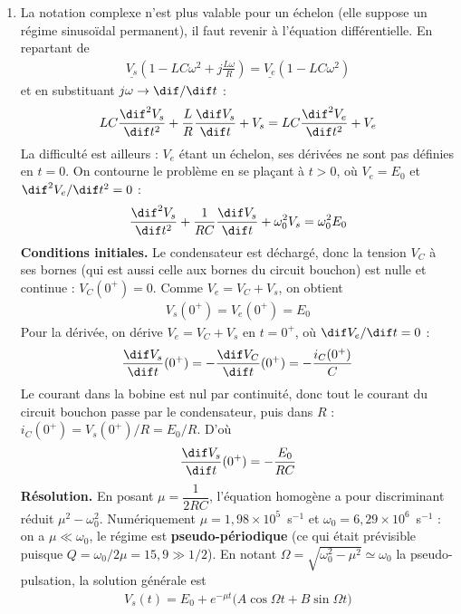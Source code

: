 \begin{correction}
\begin{enumerate}
	\item La notation complexe n'est plus valable pour un échelon (elle suppose un régime sinusoïdal permanent), il faut revenir à l'équation différentielle. En repartant de
	\begin{align*}
		\underline{V_s}\left(1-LC\omega^2+j\frac{L\omega}{R}\right)=\underline{V_e}\left(1-LC\omega^2\right)
	\end{align*}
	et en substituant $j\omega\rightarrow\dif/\dif t$ :
	\begin{align*}
		LC\frac{\dif^2V_s}{\dif t^2}+\frac{L}{R}\frac{\dif V_s}{\dif t}+V_s=LC\frac{\dif^2V_e}{\dif t^2}+V_e
	\end{align*}
	La difficulté est ailleurs : $V_e$ étant un échelon, ses dérivées ne sont pas définies en $t=0$. On contourne le problème en se plaçant à $t>0$, où $V_e=E_0$ et $\dif^2V_e/\dif t^2=0$ :
	\begin{align*}
		\frac{\dif^2V_s}{\dif t^2}+\frac{1}{RC}\frac{\dif V_s}{\dif t}+\omega_0^2V_s=\omega_0^2E_0
	\end{align*}
	\textbf{Conditions initiales.} Le condensateur est déchargé, donc la tension $V_C$ à ses bornes (qui est aussi celle aux bornes du circuit bouchon) est nulle et continue : $V_C(0^+)=0$. Comme $V_e=V_C+V_s$, on obtient
	\begin{align*}
		V_s(0^+)=V_e(0^+)=E_0
	\end{align*}
	Pour la dérivée, on dérive $V_e=V_C+V_s$ en $t=0^+$, où $\dif V_e/\dif t=0$ :
	\begin{align*}
		\frac{\dif V_s}{\dif t}(0^+)=-\frac{\dif V_C}{\dif t}(0^+)=-\frac{i_C(0^+)}{C}
	\end{align*}
	Le courant dans la bobine est nul par continuité, donc tout le courant du circuit bouchon passe par le condensateur, puis dans $R$ : $i_C(0^+)=V_s(0^+)/R=E_0/R$. D'où
	\begin{align*}
		\frac{\dif V_s}{\dif t}(0^+)=-\frac{E_0}{RC}
	\end{align*}
	\textbf{Résolution.} En posant $\mu=\dfrac{1}{2RC}$, l'équation homogène a pour discriminant réduit $\mu^2-\omega_0^2$. Numériquement $\mu=1,98\times10^{5}$~s$^{-1}$ et $\omega_0=6,29\times10^{6}$~s$^{-1}$ : on a $\mu\ll\omega_0$, le régime est \textbf{pseudo-périodique} (ce qui était prévisible puisque $Q=\omega_0/2\mu=15,9\gg1/2$). En notant $\Omega=\sqrt{\omega_0^2-\mu^2}\simeq\omega_0$ la pseudo-pulsation, la solution générale est
	\begin{align*}
		V_s(t)=E_0+e^{-\mu t}\big(A\cos\Omega t+B\sin\Omega t\big)
	\end{align*}

\end{enumerate}
\end{correction}
